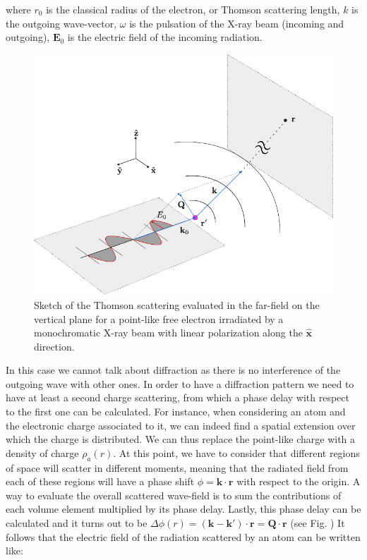 where $r_0$ is the classical radius of the electron, or Thomson scattering length, $k$ is the outgoing wave-vector, $\omega$ is the pulsation of the 
X-ray beam (incoming and outgoing), $\mathbf{E}_0$ is the electric field of the incoming radiation.


\begin{figure}[H]
    \centering
    \includegraphics[width=\textwidth]{figures/Intro/scattering.pdf}
    \caption{Sketch of the Thomson scattering evaluated in the far-field on the vertical plane for a point-like free electron irradiated by a monochromatic X-ray beam 
    with linear polarization along the $\mathbf{\hat{x}}$ direction.}
    \label{fig:scattering}
\end{figure}

In this case we cannot talk about diffraction as there is no interference of the outgoing wave with other ones. In order 
to have a diffraction pattern we need to have at least a second charge scattering, from which a phase 
delay with respect to the first one can be calculated. For instance, when considering an atom and the electronic charge 
associated to it, we can indeed find a spatial extension over which the charge is distributed. We can thus replace the 
point-like charge with a density of charge $\rho_a(r)$. 
At this point, we have to consider that different regions of space will scatter in different moments, meaning that 
the radiated field from each of these regions will have a phase shift $\phi = \mathbf k \cdot \mathbf r$  with respect to the origin. 
A way to evaluate the overall scattered wave-field is to sum the contributions of each volume element multiplied by 
its phase delay. Lastly, this phase delay can be calculated and it turns out to be $\Delta\phi(r) = (\mathbf k - \mathbf {k'})\cdot \mathbf r = \mathbf Q \cdot \mathbf r$ 
(see Fig. ) 
It follows that the electric field of the radiation scattered by an atom can be written like: 

